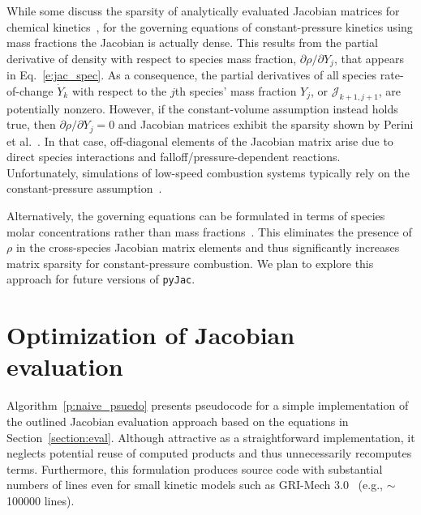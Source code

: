 \documentclass[preprint,12pt]{elsarticle}
\begin{document}
While some discuss the sparsity of analytically evaluated Jacobian matrices for chemical kinetics~\cite{Lu:2009gh,Perini:2012gy}, for the governing equations of constant-pressure kinetics using mass fractions the Jacobian is actually dense.
This results from the partial derivative of density with respect to species mass fraction, $\partial \rho / \partial Y_j$, that appears in Eq.~\eqref{e:jac_spec}.
As a consequence, the partial derivatives of all species rate-of-change $\dot{Y}_k$ with respect to the $j$th species' mass fraction $Y_j$, or $\mathcal{J}_{k+1, j+1}$, are potentially nonzero.
However, if the constant-volume assumption instead holds true, then $\partial \rho / \partial Y_j = 0$ and Jacobian matrices exhibit the sparsity shown by Perini et al.~\cite{Perini:2012gy}.
In that case, off-diagonal elements of the Jacobian matrix arise due to direct species interactions and falloff\slash pressure-dependent reactions.
Unfortunately, simulations of low-speed combustion systems typically rely on the constant-pressure assumption~\cite{Law:2006tu}.

Alternatively, the governing equations can be formulated in terms of species molar concentrations rather than mass fractions~\cite{Lu:2009gh,Bisetti:2012jw}.
This eliminates the presence of $\rho$ in the cross-species Jacobian matrix elements and thus significantly increases matrix sparsity for constant-pressure combustion.
We plan to explore this approach for future versions of \texttt{pyJac}.


\section{Optimization of Jacobian evaluation}
\label{S:opt}

Algorithm~\eqref{p:naive_psuedo} presents pseudocode for a simple implementation of the outlined Jacobian evaluation approach based on the equations in Section~\ref{section:eval}.
Although attractive as a straightforward implementation, it neglects potential reuse of computed products and thus unnecessarily recomputes terms.
Furthermore, this formulation produces source code with substantial numbers of lines even for small kinetic models such as GRI-Mech 3.0~\cite{smith_gri-mech_30} (e.g., $\sim$\num{100000} lines).
\end{document}
